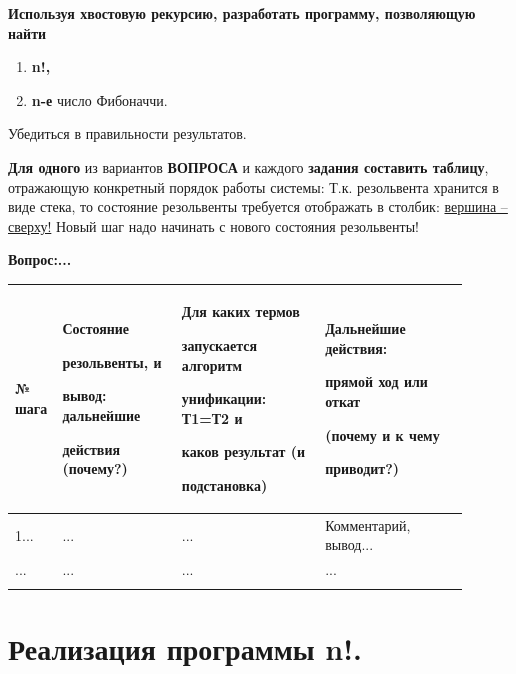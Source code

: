 \documentclass[a4paper,12pt]{article}
\begin{document}
	{\bf Используя хвостовую рекурсию, разработать программу, позволяющую найти}
	
	\begin{enumerate}
		\item {\bf n!,}
		\item {\bf n-е}  число Фибоначчи.
	\end{enumerate} 

	Убедиться в правильности результатов.
	
	{\bf Для одного} из вариантов {\bf ВОПРОСА} и каждого {\bf задания составить таблицу}, отражающую конкретный порядок работы системы: 
	Т.к. резольвента хранится в виде стека, то состояние резольвенты требуется отображать в столбик: \underline{вершина – сверху!} Новый шаг надо начинать с нового состояния резольвенты!
	
	{\bf Вопрос:...}
	
	\begin{center}
		\begin{longtable}[h!]{|p{0.05\linewidth}|p{0.25\linewidth}|p{ 0.3\linewidth}|p{ 0.3\linewidth}|}
			\hline
			{№ шага} & {Состояние 
				
				резольвенты, и 
				
				вывод: дальнейшие 
				
				действия (почему?)} & {Для каких термов 
				
				запускается алгоритм 
				
				унификации: Т1=Т2 и 
				
				каков {\bf результат} (и 
				
				подстановка)} & {Дальнейшие действия: 
				
				прямой ход или откат 
				
				(почему и к чему 
				
				приводит?)}\\
			\hline
			{1...} & {...} & {...} & {Комментарий, вывод...}\\
			\hline
			{...} & {...} & {...} & {...}\\
			\hline
			\label{m1}
		\end{longtable}
	\end{center}
	
	\newpage
	
	\section*{Реализация программы n!.}
	
\end{document}
